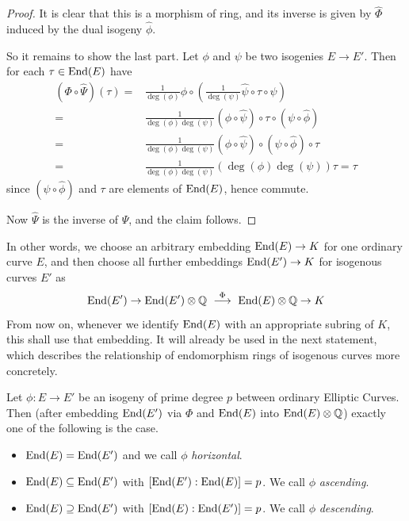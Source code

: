 \begin{proof}
    It is clear that this is a morphism of ring, and its inverse is given by $\hat{\Phi}$ induced by the dual isogeny $\hat{\phi}$.
    
    So it remains to show the last part.
    Let $\phi$ and $\psi$ be two isogenies $E \to E'$.
    Then for each $\tau \in \mathrm{End}(E)$ have
    \begin{align*}
        (\Phi \circ \hat{\Psi})(\tau) =& \frac 1 { \deg(\phi) } \phi \circ \left( \frac 1 {\deg(\psi)} \hat{\psi} \circ \tau \circ \psi \right) \\
        =& \frac 1 { \deg(\phi)\deg(\psi) } (\phi \circ \hat{\psi}) \circ \tau \circ (\psi \circ \hat{\phi}) \\
        =& \frac 1 { \deg(\phi)\deg(\psi) } (\phi \circ \hat{\psi}) \circ (\psi \circ \hat{\phi}) \circ \tau \\
        =& \frac 1 { \deg(\phi)\deg(\psi) } (\deg(\phi) \deg(\psi)) \tau = \tau
    \end{align*}
    since $(\psi \circ \hat{\phi})$ and $\tau$ are elements of $\mathrm{End}(E)$, hence commute.

    Now $\hat{\Psi}$ is the inverse of $\Psi$, and the claim follows.
\end{proof}
In other words, we choose an arbitrary embedding $\mathrm{End}(E) \to K$ for one ordinary curve $E$, and then choose all further embeddings $\mathrm{End}(E') \to K$ for isogenous curves $E'$ as
\begin{equation*}
    \End(E') \to \End(E') \otimes \Q \ \overset{\Phi}{\longrightarrow} \ \End(E) \otimes \Q \to K
\end{equation*}
From now on, whenever we identify $\mathrm{End}(E)$ with an appropriate subring of $K$, this shall use that embedding.
It will already be used in the next statement, which describes the relationship of endomorphism rings of isogenous curves more concretely.
\begin{prop}
    Let $\phi: E \to E'$ be an isogeny of prime degree $p$ between ordinary Elliptic Curves.
    Then (after embedding $\mathrm{End}(E')$ via $\Phi$ and $\mathrm{End}(E)$ into $\mathrm{End}(E) \otimes \mathbb{Q}$) exactly one of the following is the case.
    \begin{itemize}
        \item $\mathrm{End}(E) = \mathrm{End}(E')$ and we call $\phi$ \emph{horizontal}.
        \item $\mathrm{End}(E) \subseteq \mathrm{End}(E')$ with $[\mathrm{End}(E') : \mathrm{End}(E)] = p$. We call $\phi$ \emph{ascending}.
        \item $\mathrm{End}(E) \supseteq \mathrm{End}(E')$ with $[\mathrm{End}(E) : \mathrm{End}(E')] = p$. We call $\phi$ \emph{descending}.
    \end{itemize}
\end{prop}
